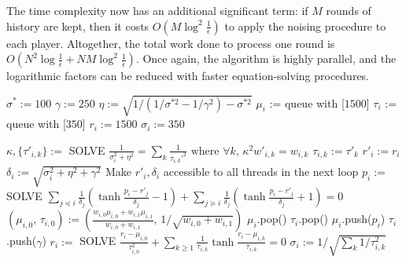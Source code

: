 The time complexity now has an additional significant term: if $M$ rounds of history are kept, then it costs $O(M\log^2\frac 1\epsilon)$ to apply the noising procedure to each player. Altogether, the total work done to process one round is $O(N^2\log\frac 1\epsilon + NM\log^2\frac 1\epsilon)$. Once again, the algorithm is highly parallel, and the logarithmic factors can be reduced with faster equation-solving procedures.

\begin{algorithm}
\caption{$init()$}
\label{alg:init2}
\begin{algorithmic}
\STATE $\sigma^* := 100$
\STATE $\gamma := 250$
\STATE $\eta := \sqrt{1 / \left( 1/\sigma^{*2} - 1/\gamma^2 \right) - \sigma^{*2}}$
\STATE $\mu_i$ := queue with [$1500$]
\STATE $\tau_i$ := queue with [$350$]
\STATE $r_i := 1500$
\STATE $\sigma_i := 350$
\ENDFOR
\end{algorithmic}
\end{algorithm}

\begin{algorithm}
\caption{$update()$}
\label{alg:update2}
\begin{algorithmic}
\STATE $\kappa,\{\tau'_{i,k}\} := $ SOLVE $\frac{1}{\sigma_i^2 + \eta^2} = \sum_k\frac{1}{\tau_{i,k}'^2}\text{ where }\forall k,\,\kappa^2w'_{i,k} = w_{i,k}$
\STATE $\tau_{i,k} := \tau'_k$
\ENDFOR
\STATE $r'_i := r_i$
\STATE $\delta_i := \sqrt{\sigma_i^2 + \eta^2 + \gamma^2}$
\STATE Make $r'_i,\delta_i$ accessible to all threads in the next loop
\ENDFOR
{}
\STATE $p_i := $ SOLVE $\sum_{j\preceq i}\frac{1}{\delta_j}\left( \tanh\frac {p_i - r'_j} {\delta_j} - 1 \right) + \sum_{j\succeq i}\frac{1}{\delta_j}\left( \tanh\frac {p_i - r'_j} {\delta_j} + 1 \right) = 0$
\STATE $(\mu_{i,0},\,\tau_{i,0}) := (\frac{w_{i,0}\mu_{i,0}+w_{i,1}\mu_{i,1}}{w_{i,0}+w_{i,1}},\,1 / \sqrt{w_{i,0}+w_{i,1}})$
\STATE $\mu_i$.pop()
\STATE $\tau_i$.pop()
\ENDIF
\STATE $\mu_i$.push($p_i$)
\STATE $\tau_i$.push($\gamma$)
\STATE $r_i := $ SOLVE $\frac{r_i-\mu_{i,0}}{\tau_{i,0}^2} + \sum_{k\ge 1} \frac{1}{\tau_{i,k}} \tanh \frac {r_i-\mu_{i,k}} {\tau_{i,k}} = 0$
\STATE $\sigma_i := 1 / \sqrt{\sum_k 1/\tau_{i,k}^2}$
\ENDFOR
\end{algorithmic}
\end{algorithm}
